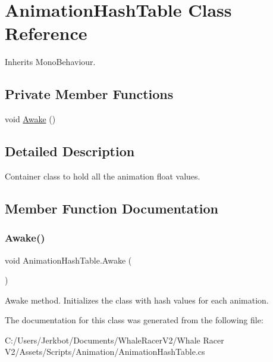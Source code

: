 \hypertarget{class_animation_hash_table}{}\section{Animation\+Hash\+Table Class Reference}
\label{class_animation_hash_table}


Inherits Mono\+Behaviour.

\subsection*{Private Member Functions}
\begin{DoxyCompactItemize}
\item 
void \hyperlink{class_animation_hash_table_ae3020d50a27b63d826dd4428a2b276f1}{Awake} ()
\end{DoxyCompactItemize}


\subsection{Detailed Description}
Container class to hold all the animation float values. 



\subsection{Member Function Documentation}
\mbox{\label{class_animation_hash_table_ae3020d50a27b63d826dd4428a2b276f1}} 
\subsubsection{\texorpdfstring{Awake()}{Awake()}}
{\footnotesize\ttfamily void Animation\+Hash\+Table.\+Awake (\begin{DoxyParamCaption}{ }\end{DoxyParamCaption})\hspace{0.3cm}{\ttfamily [private]}}



Awake method. Initializes the class with hash values for each animation. 



The documentation for this class was generated from the following file\+:\begin{DoxyCompactItemize}
\item 
C\+:/\+Users/\+Jerkbot/\+Documents/\+Whale\+Racer\+V2/\+Whale Racer V2/\+Assets/\+Scripts/\+Animation/Animation\+Hash\+Table.\+cs\end{DoxyCompactItemize}
